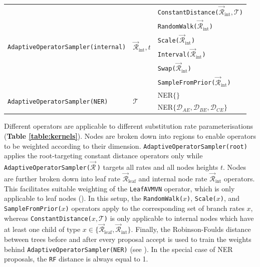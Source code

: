 \documentclass[10pt,letterpaper]{article}
\begin{document}
\begin{table}[h!]
\begin{tabular}{l l l}
\hline
 \multirow{6}{*}{\texttt{AdaptiveOperatorSampler(internal)}} & \multirow{6}{*}{$\vec{\mathcal{R}}^{\,}_\text{int}, t$} & \texttt{ConstantDistance($\vec{\mathcal{R}}^{\,}_\text{int}, \mathcal{T}$)}   \\ 
&& \texttt{RandomWalk($\vec{\mathcal{R}}^{\,}_\text{int}$)}  \\
&& \texttt{Scale($\vec{\mathcal{R}}^{\,}_\text{int}$)}   \\
&& \texttt{Interval($\vec{\mathcal{R}}^{\,}_\text{int}$)}   \\
&& \texttt{Swap($\vec{\mathcal{R}}^{\,}_\text{int}$)}  \\
&& \texttt{SampleFromPrior($\vec{\mathcal{R}}^{\,}_\text{int}$)} \\
\hline
\hline
 \multirow{2}{*}{\texttt{AdaptiveOperatorSampler(NER)}} & \multirow{2}{*}{$\mathcal{T}$} & NER$\{  \}$ \\ 
 && NER$\{ \mathcal{D}_{AE}, \mathcal{D}_{BE}, \mathcal{D}_{CE} \}$ \\
\end{tabular}
\begin{flushleft}
Different operators are applicable to different substitution rate parameterisations (\textbf{Table \ref{table:kernels}}).
Nodes are broken down into regions to enable operators to be weighted according to their dimension.  
\texttt{AdaptiveOperatorSampler(root)} applies the root-targeting constant distance operators only \cite{zhang2020improving} while \texttt{AdaptiveOperatorSampler($\vec{\mathcal{R}}^{\,}$)} targets all rates and all nodes heights $t$. 
Nodes are further broken down into leaf rate $\vec{\mathcal{R}}^{\,}_\text{leaf}$ and internal node rate $\vec{\mathcal{R}}^{\,}_\text{int}$ operators.
This facilitates suitable weighting of the \texttt{LeafAVMVN} operator, which is only applicable to leaf nodes (\textbf{}).
In this setup, the \texttt{RandomWalk($x$)}, \texttt{Scale($x$)}, and \texttt{SampleFromPrior($x$)} operators apply to the corresponding set of branch rates $x$, whereas \texttt{ConstantDistance($x, \mathcal{T}$)} is only applicable to internal nodes which have at least one child of type $x \in \{\vec{\mathcal{R}}^{\,}_\text{leaf}, \vec{\mathcal{R}}^{\,}_\text{int}\}$.
Finally, the Robinson-Foulds distance between trees before and after every proposal accept is used to train the weights behind \texttt{AdaptiveOperatorSampler(NER)} (see \textbf{}). In the special case of NER proposals, the \texttt{RF} distance is always equal to 1. 
\end{flushleft}
\label{table:adaptiveSampling}
\end{table}
\end{document}
